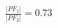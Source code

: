\documentclass[preview]{standalone}
\begin{document}
\begin{align*}
\frac{|PF_1|}{|PF_2|} = 0.73
\end{align*}
\end{document}
